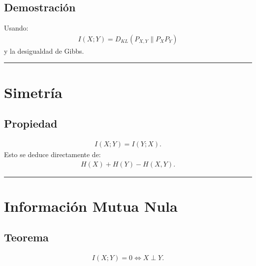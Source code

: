\documentclass[letterpaper,10pt,english]{jupyterBook}
\begin{document}
\subsection{Demostración}
\label{\detokenize{02_mathematical_foundations/properties_theorems:id8}}
\sphinxAtStartPar
Usando:
\begin{equation*}
\begin{split}
I(X;Y)=D_{KL}(P_{X,Y}\|P_XP_Y)
\end{split}
\end{equation*}
\sphinxAtStartPar
y la desigualdad de Gibbs.


\bigskip\hrule\bigskip



\section{Simetría}
\label{\detokenize{02_mathematical_foundations/properties_theorems:simetria}}

\subsection{Propiedad}
\label{\detokenize{02_mathematical_foundations/properties_theorems:propiedad}}\begin{equation*}
\begin{split}
I(X;Y)=I(Y;X).
\end{split}
\end{equation*}
\sphinxAtStartPar
Esto se deduce directamente de:
\begin{equation*}
\begin{split}
H(X)+H(Y)-H(X,Y).
\end{split}
\end{equation*}

\bigskip\hrule\bigskip



\section{Información Mutua Nula}
\label{\detokenize{02_mathematical_foundations/properties_theorems:informacion-mutua-nula}}

\subsection{Teorema}
\label{\detokenize{02_mathematical_foundations/properties_theorems:id9}}\begin{equation*}
\begin{split}
I(X;Y)=0 \iff X\perp Y.
\end{split}
\end{equation*}
\end{document}
